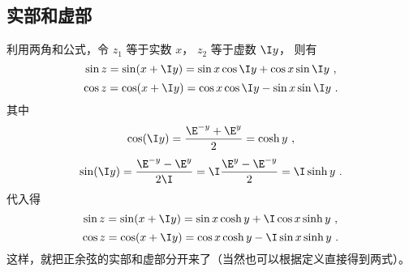 \subsection{实部和虚部}
利用两角和公式，令 $z_1$ 等于实数 $x$，  $z_2$ 等于虚数 $\I y$， 则有
 \begin{equation}\label{eq_CTrig_7}
\sin z = \sin(x + \I y) = \sin x\cos \I y + \cos x\sin \I y~,
\end{equation} 
\begin{equation}
\cos z = \cos(x + \I y) = \cos x\cos \I y - \sin x\sin \I y~.
\end{equation} 
其中
\begin{equation}\label{eq_CTrig_5}
\cos(\I y) = \frac{\E^{-y} + \E^y}{2} = \cosh y~,
\end{equation} 
\begin{equation}\label{eq_CTrig_6}
\sin(\I y) = \frac{\E^{-y} - \E^y}{2\I} = \I\frac{\E^y - \E^{-y}}{2} = \I\sinh y~.
\end{equation} 
代入得
\begin{equation}
\sin z = \sin(x + \I y) = \sin x\cosh y + \I\cos x\sinh y~,
\end{equation} 
\begin{equation}
\cos z = \cos(x + \I y) = \cos x\cosh y - \I\sin x\sinh y~.
\end{equation}  
这样，就把正余弦的实部和虚部分开来了（当然也可以根据定义直接得到两式）。























